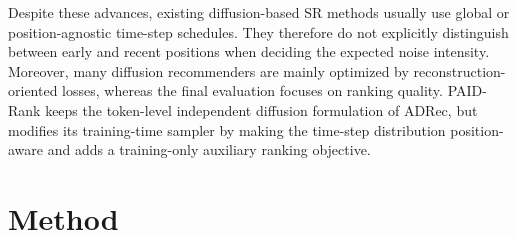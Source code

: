 \documentclass[runningheads,a4paper]{llncs}
\begin{document}
Despite these advances, existing diffusion-based SR methods usually use global or position-agnostic time-step schedules. They therefore do not explicitly distinguish between early and recent positions when deciding the expected noise intensity. Moreover, many diffusion recommenders are mainly optimized by reconstruction-oriented losses, whereas the final evaluation focuses on ranking quality. PAID-Rank keeps the token-level independent diffusion formulation of ADRec, but modifies its training-time sampler by making the time-step distribution position-aware and adds a training-only auxiliary ranking objective.

\begin{table}[tbp]
    \centering
    \caption{Comparison of representative diffusion-based sequential recommendation methods. ``Gran.'' denotes diffusion granularity. ``Sched.'' denotes the time-step schedule. ``Rank'' indicates whether an explicit auxiliary ranking constraint is used. ``Pos-aware'' indicates whether the time-step schedule depends on sequence position.}
    \label{tab:method_comparison}
    \scriptsize
    \setlength{\tabcolsep}{3.2pt}
    \renewcommand{\arraystretch}{1.08}
\end{table}

\section{Method}
\label{sec:method}
\end{document}
